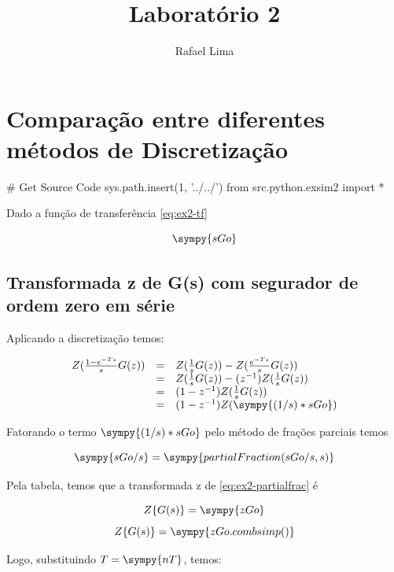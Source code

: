 \documentclass[a4paper,11pt]{article}
\title{Laboratório 2} %
\author{Rafael Lima}
\begin{document}

\section{Comparação entre diferentes métodos de Discretização}

\begin{sympycode}
# Get Source Code
sys.path.insert(1, '../../')
from src.python.exsim2 import *
\end{sympycode}

Dado a função de transferência \ref{eq:ex2-tf}

\begin{equation}\label{eq:ex2-tf}
\sympy{sGo}
\end{equation}

\subsection{Transformada z de G(s) com segurador de ordem zero em série}

Aplicando a discretização temos:

$$
\begin{array}{lcl}
    Z(\frac{1-e^{-Ts}}{s}G(z)) &=& Z(\frac{1}{s}G(z)) - Z(\frac{e^{-Ts}}{s}G(z))\\
    &=& Z(\frac{1}{s}G(z)) - (z^{-1})Z(\frac{1}{s}G(z))\\
    &=& (1 - z^{-1})Z(\frac{1}{s}G(z))\\
    &=& (1 - z^{-1})Z(\sympy{(1/s)*sGo})\\
\end{array}
$$

Fatorando o termo $\sympy{(1/s)*sGo}$ pelo método de frações parciais temos

\begin{equation}\label{eq:ex2-partialfrac}
    \sympy{sGo/s} = \sympy{partialFraction(sGo/s,s)}
\end{equation}

Pela tabela, temos que a transformada z de \ref{eq:ex2-partialfrac} é

$$Z\{G(s)\} = \sympy{zGo}$$
$$Z\{G(s)\} = \sympy{zGo.combsimp()}$$

Logo, substituindo $T = \sympy{nT}$, temos:
\end{document}
